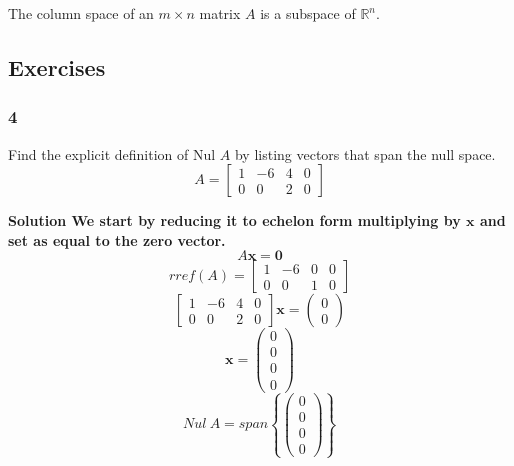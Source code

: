       \begin{theorem}\label{theorem: column space}
        The column space of an $ m × n $ matrix $ A $ is a subspace of $ \mathbb R^{n} $. 
      \end{theorem}

    \subsection*{Exercises}
      \subsubsection*{4}
        Find the explicit definition of Nul $ A $ by listing vectors that span the null space. 
        \[
        A = \begin{bmatrix}
          1 & -6 & 4 & 0\\ 
          0 & 0 & 2 & 0
        \end{bmatrix}
        \]

        \bf{Solution} \newline \newline 
        We start by reducing it to echelon form multiplying by $ \mathbf x $ and set as equal to the zero vector. 
        \[
        A \mathbf x = \mathbf 0
        \]
        \[
        rref(A) = \begin{bmatrix}
          1 & -6 & 0 & 0\\ 
          0 & 0 & 1 & 0
        \end{bmatrix}
        \]
        \[
          \begin{bmatrix}
            1 & -6 & 4 & 0\\ 
            0 & 0 & 2 & 0
          \end{bmatrix} 
          \mathbf x = 
          \begin{pmatrix}
             0  \\ 
             0 
          \end{pmatrix}
        \]
        \[
        \mathbf x = \begin{pmatrix}
           0  \\ 
           0  \\ 
           0  \\
           0  
        \end{pmatrix}
        \]
        \[
        Nul \ A = span \left\{\begin{pmatrix}
          0  \\ 
          0  \\ 
          0  \\
          0  
       \end{pmatrix}\right\}_{}^{} 
        \]

